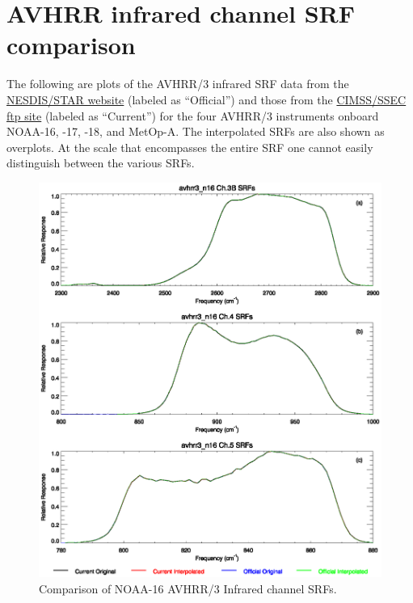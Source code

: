 \section{AVHRR infrared channel SRF comparison}
\label{app:srf}
The following are plots of the AVHRR/3 infrared SRF data from the \href{http://www.star.nesdis.noaa.gov/smcd/spb/fwu/solar_cal/spec_resp_func}{NESDIS/STAR website} (labeled as ``Official'') and those from the \href{ftp://monkey.ssec.wisc.edu/pub/srf}{CIMSS/SSEC ftp site} (labeled as ``Current'') for the four AVHRR/3 instruments onboard NOAA-16, -17, -18, and MetOp-A. The interpolated SRFs are also shown as overplots. At the scale that encompasses the entire SRF one cannot easily distinguish between the various SRFs.
\begin{figure}[htp]
  \centering
  \includegraphics[scale=1]{graphics/nominal/avhrr3_n16.srf.eps}
  \caption{Comparison of NOAA-16 AVHRR/3 Infrared channel SRFs.}
  \label{fig:avhrr3_n16}
\end{figure}

